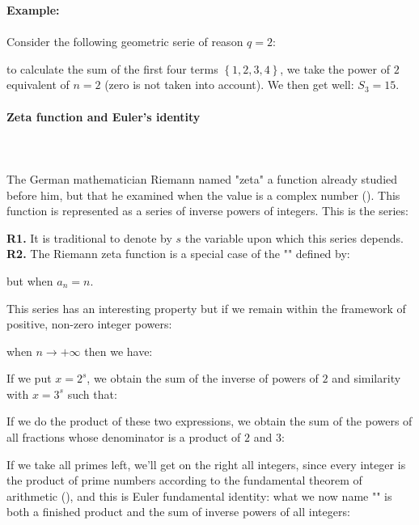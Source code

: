 	
	\begin{tcolorbox}[colframe=black,colback=white,sharp corners]
	\textbf{{\Large {}}Example:}\\\\
	Consider the following geometric serie of reason $q = 2$:
	
	to calculate the sum of the first four terms $\left\lbrace 1,2,3,4 \right\rbrace$, we take the power of $2$ equivalent of $n=2$ (zero is not taken into account). We then get well: $S_3=15$.
	\end{tcolorbox}
	
	\paragraph{Zeta function and Euler's identity}\label{zeta function}\mbox{}\\\\
	The German mathematician Riemann named "zeta" a function already studied before him, but that he examined when the value is a complex number (). This function is represented as a series of inverse powers of integers. This is the series:

	
	\begin{tcolorbox}[title=Remarks,colframe=black,arc=10pt]
	\textbf{R1.} It is traditional to denote by $s$ the variable upon which this series depends.\\
	
	\textbf{R2.} The Riemann zeta function is a special case of the "" defined by:
	
	but when $a_n=n$.
	\end{tcolorbox}
	This series has an interesting property but if we remain within the framework of positive, non-zero integer powers:
	
	when $n\longrightarrow +\infty$ then we have:
	
	If we put $x=2^s$, we obtain the sum of the inverse of powers of $2$ and similarity with $x=3^s$ such that:
	
	If we do the product of these two expressions, we obtain the sum of the powers of all fractions whose denominator is a product of $2$ and $3$:
	
	If we take all primes left, we'll get on the right all integers, since every integer is the product of prime numbers according to the fundamental theorem of arithmetic (), and this is Euler fundamental identity: what we now name "" is both a finished product and the sum of inverse powers of all integers:
	
